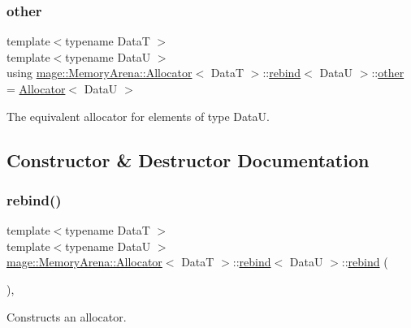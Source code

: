 \subsubsection{\texorpdfstring{other}{other}}
{\footnotesize\ttfamily template$<$typename DataT $>$ \\
template$<$typename DataU $>$ \\
using \hyperlink{structmage_1_1_memory_arena_1_1_allocator}{mage\+::\+Memory\+Arena\+::\+Allocator}$<$ DataT $>$\+::\hyperlink{structmage_1_1_memory_arena_1_1_allocator_1_1rebind}{rebind}$<$ DataU $>$\+::\hyperlink{structmage_1_1_memory_arena_1_1_allocator_1_1rebind_aad55bf384b9a95ae1c2158f1d2afe180}{other} =  \hyperlink{structmage_1_1_memory_arena_1_1_allocator}{Allocator}$<$ DataU $>$}

The equivalent allocator for elements of type {\ttfamily DataU}. 

\subsection{Constructor \& Destructor Documentation}
\hypertarget{structmage_1_1_memory_arena_1_1_allocator_1_1rebind_accff2c1aafa45e3c5cc9f5d66b4a3bb5}{}\label{structmage_1_1_memory_arena_1_1_allocator_1_1rebind_accff2c1aafa45e3c5cc9f5d66b4a3bb5} 
\subsubsection{\texorpdfstring{rebind()}{rebind()}\hspace{0.1cm}{\footnotesize\ttfamily [1/3]}}
{\footnotesize\ttfamily template$<$typename DataT $>$ \\
template$<$typename DataU $>$ \\
\hyperlink{structmage_1_1_memory_arena_1_1_allocator}{mage\+::\+Memory\+Arena\+::\+Allocator}$<$ DataT $>$\+::\hyperlink{structmage_1_1_memory_arena_1_1_allocator_1_1rebind}{rebind}$<$ DataU $>$\+::\hyperlink{structmage_1_1_memory_arena_1_1_allocator_1_1rebind}{rebind} (\begin{DoxyParamCaption}{ }\end{DoxyParamCaption})\hspace{0.3cm}{\ttfamily [private]}, {\ttfamily [delete]}}

Constructs an allocator. \hypertarget{structmage_1_1_memory_arena_1_1_allocator_1_1rebind_ad1b38f344a499497a20d11f292958469}{}\label{structmage_1_1_memory_arena_1_1_allocator_1_1rebind_ad1b38f344a499497a20d11f292958469} 
